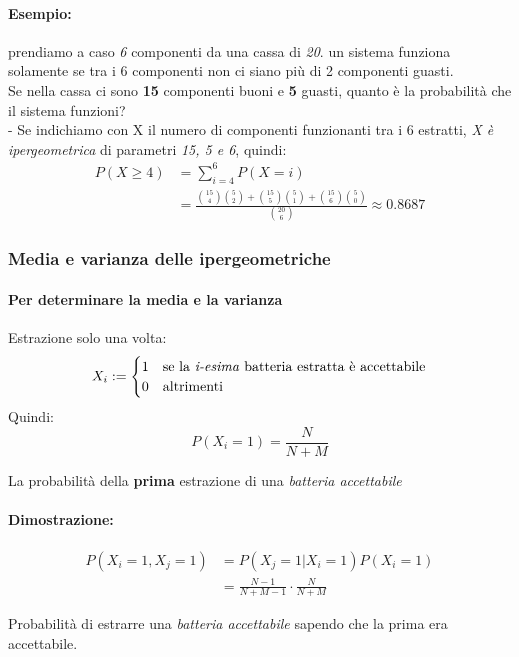 \documentclass[]{article}
\begin{document}
    \paragraph{Esempio:} prendiamo a caso \textit{6} componenti da una cassa di \textit{20}. un sistema funziona solamente se tra i 6 componenti
    non ci siano più di 2 componenti guasti. \\
    Se nella cassa ci sono \textbf{15} componenti buoni e \textbf{5} guasti, quanto è la probabilità che il sistema funzioni? \\
    - Se indichiamo con X il numero di componenti funzionanti tra i 6 estratti, \textit{X è ipergeometrica} di parametri \textit{15, 5 e 6}, quindi:
    \begin{equation*}
        \begin{split}
            P(X \geq 4) &= \sum_{i = 4}^{6} P(X = i) \\
            & = \frac{\binom{15}{4} \binom{5}{2} + \binom{15}{5} \binom{5}{1} + \binom{15}{6} \binom{5}{0}}{\binom{20}{6}} \approx 0.8687
        \end{split}
    \end{equation*}

    \subsubsection{Media e varianza delle ipergeometriche}
    \paragraph{Per determinare la media e la varianza} Estrazione solo una volta:
    \begin{equation*}
        X_i :=
        \begin{cases}
            1 & \text{se la \textit{i-esima} batteria estratta è accettabile} \\
            0 & \text{altrimenti}
        \end{cases}
    \end{equation*}
    Quindi:
    \[ P(X_i = 1) = \frac{N}{N + M} \]
    \centerline{La probabilità della \textbf{prima} estrazione di una \textit{batteria accettabile}}
    \paragraph{Dimostrazione:} 
    \begin{equation*}
        \begin{split}
            P(X_i = 1, X_j = 1) &= P(X_j = 1 | X_i = 1) P(X_i = 1) \\
            & = \frac{N - 1}{N + M - 1} \cdot \frac{N}{N + M}
        \end{split}
    \end{equation*}
    \centerline{Probabilità di estrarre una \textit{batteria accettabile} sapendo che la prima era accettabile.}
\end{document}
